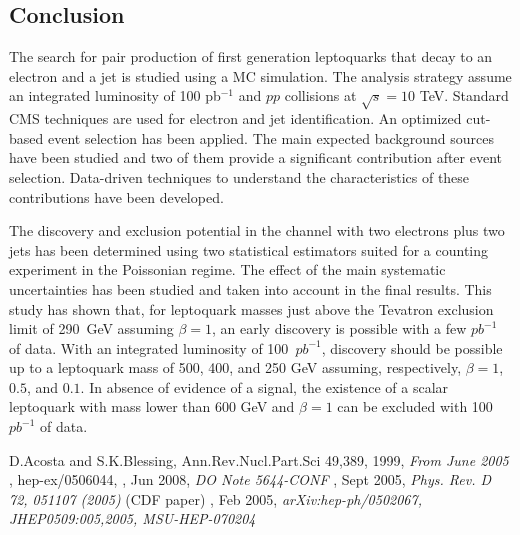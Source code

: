 \documentclass{cmspaper}
\begin{document}
\begin{linenumbers}
\section{Conclusion}

The search for pair production of first generation leptoquarks that decay to
an electron and a jet is studied using a MC simulation.
The analysis strategy 
assume an integrated luminosity of 100 pb$^{-1}$ and $pp$ collisions 
at $\sqrt{s}=10$ TeV.
Standard CMS techniques are used for electron and jet identification. 
An optimized cut-based event selection has been applied.
The main expected background sources have been studied and two of them provide 
a significant contribution after event selection. 
Data-driven techniques to understand the characteristics of these contributions have been developed.

The discovery and exclusion potential in the channel with two electrons plus two jets has 
been determined using two statistical estimators suited for a counting experiment in the Poissonian regime.
The effect of the main systematic uncertainties 
has been studied and taken into account in the final 
results. This study has shown that, 
for leptoquark masses just above the Tevatron exclusion limit of 290~GeV
 assuming $\beta=1$, 
an early discovery is possible with a few $pb^{-1}$ of data.
With an integrated luminosity of 100~$pb^{-1}$, discovery should be possible up
to a leptoquark mass of 500, 400, and 250 GeV assuming, respectively, 
$\beta=1$, $0.5$, and $0.1$. 
In absence of evidence of a signal, the existence of a scalar leptoquark 
with mass lower than 600 GeV 
and $\beta=1$ can be excluded with 100~$pb^{-1}$ of data.



\begin{thebibliography}{}

 {D.Acosta and S.K.Blessing, Ann.Rev.Nucl.Part.Sci 49,389},
  1999,
  {\em From June 2005}
, hep-ex/0506044,
, Jun 2008,
  {\em DO Note 5644-CONF}
, Sept 2005,
  {\em Phys. Rev. D 72, 051107 (2005)} (CDF paper)
, Feb 2005,
  {\em arXiv:hep-ph/0502067, JHEP0509:005,2005, MSU-HEP-070204}
  

\end{thebibliography}
\end{linenumbers}
\end{document}
